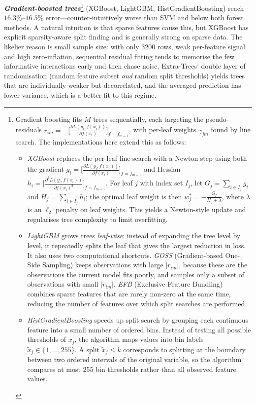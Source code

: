 \documentclass[11pt,a4paper]{article}
\begin{document}
\textbf{\textit{Gradient-boosted trees}}\footnote{
Gradient boosting fits $M$ trees sequentially, each 
targeting the pseudo-residuals 
$r_{im} = -\bigl[\frac{\partial L(y_i, f(x_i))}{\partial f(x_i)}\bigr]_{f=f_{m-1}}$, 
with per-leaf weights $\gamma_{jm}$ found by line search.
The implementations here extend this as follows:
\begin{itemize}
\item \emph{XGBoost} replaces the per-leaf line search with a Newton step using
both the gradient
$g_i = \bigl[\frac{\partial L(y_i, f(x_i))}{\partial f(x_i)}\bigr]_{f=f_{m-1}}$
and Hessian
$h_i = \bigl[\frac{\partial^2 L(y_i, f(x_i))}{\partial f(x_i)^2}\bigr]_{f=f_{m-1}}$.
For leaf $j$ with index set $I_j$, let
$G_j = \sum_{i \in I_j} g_i$ and $H_j = \sum_{i \in I_j} h_i$;
the optimal leaf weight is then $w_j^* = -\frac{G_j}{H_j + \lambda}$,
where $\lambda$ is an $\ell_2$ penalty on leaf weights.
This yields a Newton-style update and regularises tree complexity to
limit overfitting.

\item \emph{LightGBM} grows trees \emph{leaf-wise}: instead of expanding 
the tree level by level, it repeatedly splits the leaf that gives the 
largest reduction in loss. It also uses two computational shortcuts. 
\emph{GOSS} (Gradient-based One-Side Sampling) keeps observations with 
large $|r_{im}|$, because these are the observations the current model 
fits poorly, and samples only a subset of observations with small 
$|r_{im}|$. \emph{EFB} (Exclusive Feature Bundling) combines sparse 
features that are rarely non-zero at the same time, reducing the number 
of features over which split searches are performed.

\item \emph{HistGradientBoosting} speeds up split search by grouping each continuous feature into a 
small number of ordered bins. Instead of testing all possible thresholds 
of $x_j$, the algorithm maps values into bin labels
$\tilde{x}_j \in \{1,\ldots,255\}$.
A split $\tilde{x}_j \leq k$ corresponds to splitting at the boundary 
between two ordered intervals of the original variable, so the algorithm 
compares at most $255$ bin thresholds rather than all observed feature 
values.
\end{itemize}
}
(XGBoost, LightGBM, HistGradientBoosting) reach $16.3\%$--$16.5\%$ error---counter-intuitively worse than SVM and below both forest methods. A natural intuition is that sparse
features cause this, but XGBoost has explicit sparsity-aware split finding and is generally
strong on sparse data. The likelier reason is small sample size: with only $3200$ rows,
weak per-feature signal and high zero-inflation, sequential residual fitting tends to
memorise the few informative interactions early and then chase noise. Extra-Trees' double
layer of randomisation (random feature subset \emph{and} random split thresholds) yields
trees that are individually weaker but decorrelated, and the averaged prediction has lower
variance, which is a better fit to this regime.
\end{document}
